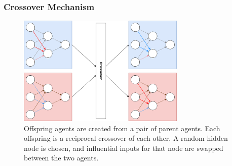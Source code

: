 \documentclass[aspectratio=169]{beamer}
\begin{document}
	\begin{frame}
		\frametitle{Crossover Mechanism}

		\begin{figure}
			\includegraphics[width=80mm]{crossover.png}
			\caption{Offspring agents are created from a pair of parent agents.
			Each offspring is a reciprocal crossover of each other. A random hidden node is chosen, and influential inputs for that node are swapped between the two agents.}
		\end{figure}

		\begin{figure}
		\end{figure}
				
	\end{frame}
\end{document}
